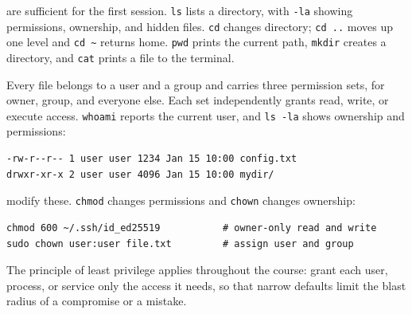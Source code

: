 
 are sufficient for the first session.
\texttt{ls} lists a directory, with \texttt{-la} showing permissions, ownership, and hidden files.
\texttt{cd} changes directory; \texttt{cd ..} moves up one level and \texttt{cd \~{}} returns home.
\texttt{pwd} prints the current path, \texttt{mkdir} creates a directory,
and \texttt{cat} prints a file to the terminal.

\vspace{2.5em}
Every file belongs to a user and a group and carries three permission sets, for owner, group, and everyone else.
Each set independently grants read, write, or execute access.
\texttt{whoami} reports the current user, and \texttt{ls -la} shows ownership and permissions:

\begin{verbatim}
-rw-r--r-- 1 user user 1234 Jan 15 10:00 config.txt
drwxr-xr-x 2 user user 4096 Jan 15 10:00 mydir/
\end{verbatim}


 modify these.
\texttt{chmod} changes permissions and \texttt{chown} changes ownership:

\begin{verbatim}
chmod 600 ~/.ssh/id_ed25519           # owner-only read and write
sudo chown user:user file.txt         # assign user and group
\end{verbatim}

The principle of least privilege applies throughout the course:
grant each user, process, or service only the access it needs,
so that narrow defaults limit the blast radius of a compromise or a mistake.




\newpage
